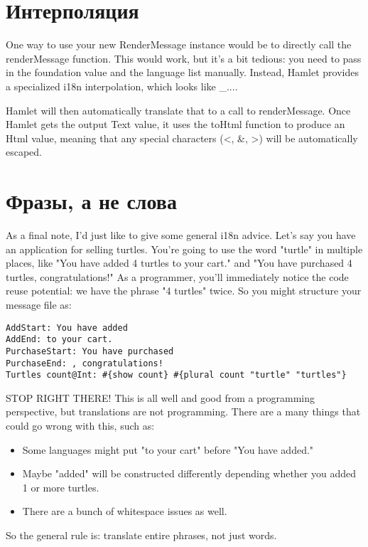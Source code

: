 \section{Интерполяция} %

One way to use your new RenderMessage instance would be to directly call the renderMessage function. This would work, but it's a bit tedious: you need to pass in the foundation value and the language list manually. Instead, Hamlet provides a specialized i18n interpolation, which looks like _{...}.


Hamlet will then automatically translate that to a call to renderMessage. Once Hamlet gets the output Text value, it uses the toHtml function to produce an Html value, meaning that any special characters (<, &, >) will be automatically escaped.

\section{Фразы, а не слова} %

As a final note, I'd just like to give some general i18n advice. Let's say you have an application for selling turtles. You're going to use the word "turtle" in multiple places, like "You have added 4 turtles to your cart." and "You have purchased 4 turtles, congratulations!" As a programmer, you'll immediately notice the code reuse potential: we have the phrase "4 turtles" twice. So you might structure your message file as:

\begin{lstlisting}
AddStart: You have added
AddEnd: to your cart.
PurchaseStart: You have purchased
PurchaseEnd: , congratulations!
Turtles count@Int: #{show count} #{plural count "turtle" "turtles"}
\end{lstlisting}

STOP RIGHT THERE! This is all well and good from a programming perspective, but translations are not programming. There are a many things that could go wrong with this, such as:

\begin{itemize}
  \item Some languages might put "to your cart" before "You have added."
  \item Maybe "added" will be constructed differently depending whether you added 1 or more turtles.
  \item There are a bunch of whitespace issues as well.
\end{itemize}

So the general rule is: translate entire phrases, not just words.
